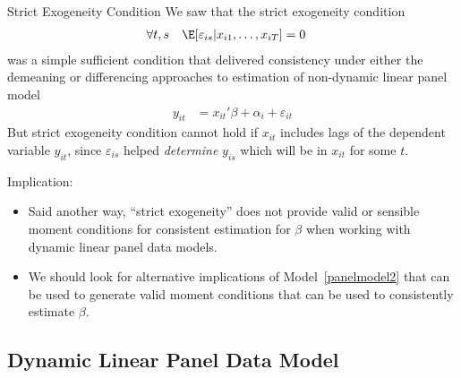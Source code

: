 \documentclass[aspectratio=169, handout]{beamer}
\begin{document}
{\footnotesize
\begin{frame}{Strict Exogeneity Condition}
We saw that the strict exogeneity condition
\begin{align*}
  \forall t,s
  \quad
  \E[\varepsilon_{is}|x_{i1},\ldots,x_{iT}]
  &= 0
\end{align*}
was a simple sufficient condition that delivered
consistency under either the demeaning or differencing approaches
to estimation of non-dynamic linear panel model
\begin{align}
  y_{it}
  &=
  x_{it}'\beta
  + \alpha_i
  + \varepsilon_{it}
  \label{panelmodel2}
\end{align}
But strict exogeneity condition \alert{cannot} hold if $x_{it}$ includes
lags of the dependent variable $y_{it}$, since $\varepsilon_{is}$ helped
\emph{determine} $y_{is}$ which will be in $x_{it}$ for some $t$.

Implication:
\begin{itemize}
  \item Said another way, ``strict exogeneity'' does not provide valid
    or sensible moment conditions for consistent estimation for $\beta$
    when working with dynamic linear panel data models.
  \item We should look for alternative implications of
    Model~\ref{panelmodel2} that can be used to generate valid moment
    conditions that can be used to consistently estimate $\beta$.
\end{itemize}
\end{frame}
}


\subsection{Dynamic Linear Panel Data Model}
\end{document}
